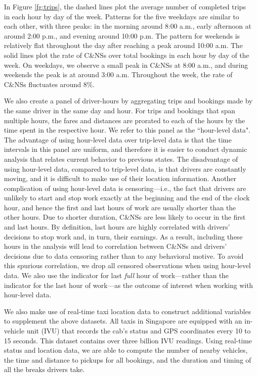 \documentclass[reviewmode]{AEA}
\begin{document}
In Figure \ref{fg:trips}, the dashed lines plot the average number of completed trips in each hour by day of the week. Patterns for the five weekdays are similar to each other, with three peaks: in the morning around 8:00 a.m., early afternoon at around 2:00 p.m., and evening around 10:00 p.m. The pattern for weekends is relatively flat throughout the day after reaching a peak around 10:00 a.m. The solid lines plot the rate of C\&NSs over total bookings in each hour by day of the week. On weekdays, we observe a small peak in C\&NSs at 8:00 a.m., and during weekends the peak is at around 3:00 a.m. Throughout the week, the rate of C\&NSs fluctuates around 8\%.


We also create a panel of driver-hours by aggregating trips and bookings made by the same driver in the same day and hour. For trips and bookings that span multiple hours, the fares and distances are prorated to each of the hours by the time spent in the respective hour. We refer to this panel as the ``hour-level data". The advantage of using hour-level data over trip-level data is that the time intervals in this panel are uniform, and therefore it is easier to conduct dynamic analysis that relates current behavior to previous states. The disadvantage of using hour-level data, compared to trip-level data, is that drivers are constantly moving, and it is difficult to make use of their location information. Another complication of using hour-level data is censoring---i.e., the fact that drivers are unlikely to start and stop work exactly at the beginning and the end of the clock hour, and hence the first and last hours of work are usually shorter than the other hours. Due to shorter duration, C\&NSs are less likely to occur in the first and last hours. By definition, last hours are highly correlated with drivers' decisions to stop work and, in turn, their earnings. As a result, including these hours in the analysis will lead to correlation between C\&NSs and drivers' decisions due to data censoring rather than to any behavioral motive. To avoid this spurious correlation, we drop all censored observations when using hour-level data. We also use the indicator for last \emph{full} hour of work---rather than the indicator for the last hour of work---as the outcome of interest when working with hour-level data.

We also make use of real-time taxi location data to construct additional variables to supplement the above datasets. All taxis in Singapore are equipped with an in-vehicle unit (IVU) that records the cab's status and GPS coordinates every 10 to 15 seconds. This dataset contains over three billion IVU readings. Using real-time status and location data, we are able to compute the number of nearby vehicles, the time and distance to pickups for all bookings, and the duration and timing of all the breaks drivers take.
\end{document}
